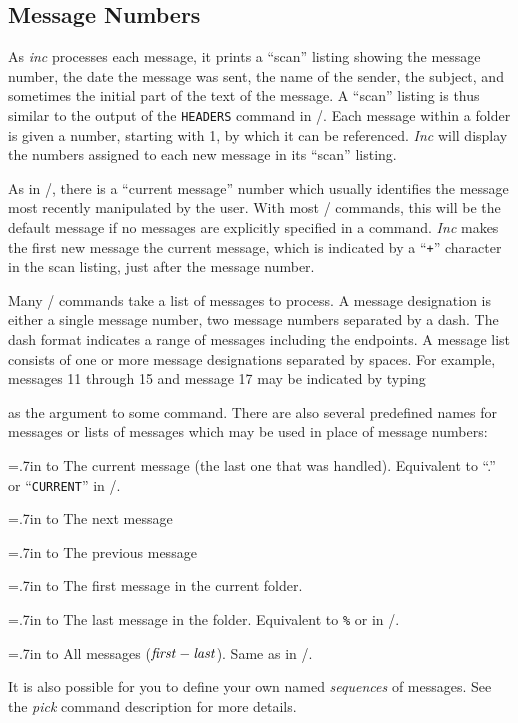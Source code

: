 \subsection{Message Numbers}\label{Scan}

As {\it inc\/} processes each message, it prints a ``scan'' listing showing
the message number, the date the message was sent,
the name of the sender, the subject, and sometimes the initial part of the
text of the message.  A ``scan'' listing is thus similar to the output of
the {\tt HEADERS} command in \MM/.  Each message within a folder is given a
number, starting with 1, by which it can be referenced.  {\it
Inc\/} will display the numbers assigned to each new message in its ``scan''
listing.

As in \MM/, there is a ``current message'' number which usually identifies the
message most recently manipulated by the user.  With most \MH/ commands,
this will be the default message if no messages are explicitly specified in
a command.  {\it Inc\/} makes the first new message the current message,
which is indicated by a ``{\tt+}'' character in the scan listing, just after
the message number.

Many \MH/ commands take a list of messages to process. A message designation
is either a single message number, two message numbers separated by a dash.
The dash format indicates a range of messages including the endpoints. A
message list consists of one or more message designations separated by
spaces. For example, messages 11 through 15 and message 17 may be indicated
by typing


as the argument to some command.  There are also several predefined names
for messages or lists of messages which may be used in place of message
numbers:

\bigskip
\begingroup\parskip=0pt
\def\titem[#1]{\par\hangafter=1\hangindent=.7in\noindent
	\hbox to\hangindent{\it\hfil#1\qquad}\ignorespaces}

\titem[cur] The current message (the last one that was handled).  Equivalent
  to ``.'' or ``{\tt CURRENT}'' in \MM/.
\titem[next] The next message 
\titem[prev] The previous message
\titem[first] The first message in the current folder.
\titem[last] The last message in the folder.  Equivalent to {\tt\%} or
  {\tt*} in \MM/.
\titem[all] All messages ($\it first-last$).  Same as in \MM/.
\endgroup

It is also possible for you to define your own named {\em sequences\/} of
messages.  See the {\it pick\/} command description for more details.

